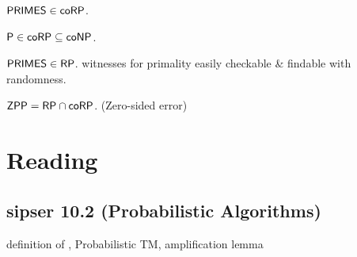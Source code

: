 \documentclass{article}
\begin{document}
\begin{corollary}
  \(\text{\sf PRIMES} \in \text{\sf coRP}\).
\end{corollary}

\begin{theorem}
  \(\text{\sf P} \in \text{\sf coRP} \subseteq \text{\sf coNP}\).
\end{theorem}

\begin{theorem}
  \(\text{\sf PRIMES} \in \text{\sf RP}\). witnesses for primality easily checkable \& findable with randomness.
\end{theorem}

\begin{definition}
  \(\text{\sf ZPP} = \text{\sf RP} \cap \text{\sf coRP}\). (Zero-sided error)
\end{definition}

\section{Reading}

\subsection{sipser 10.2 (Probabilistic Algorithms)}

definition of \BPP, Probabilistic TM, amplification lemma
\end{document}
